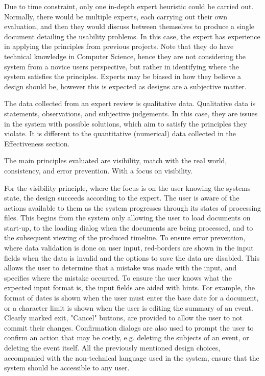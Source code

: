 \par Due to time constraint, only one in-depth expert heuristic could be carried out. Normally, there would be multiple experts, each carrying out their own evaluation, and then they would discuss between themselves to produce a single document detailing the usability problems. In this case, the expert has experience in applying the principles from previous projects. Note that they do have technical knowledge in Computer Science, hence they are not considering the system from a novice users perspective, but rather in identifying where the system satisfies the principles. Experts may be biased in how they believe a design should be, however this is expected as designs are a subjective matter.

\par The data collected from an expert review is qualitative data. Qualitative data is statements, observations, and subjective judgements. In this case, they are issues in the system with possible solutions, which aim to satisfy the principles they violate. It is different to the quantitative (numerical) data collected in the Effectiveness section.

\par The main principles evaluated are visibility, match with the real world, consistency, and error prevention. With a focus on visibility.

\par For the visibility principle, where the focus is on the user knowing the systems state, the design succeeds according to the expert. The user is aware of the actions available to them as the system progresses through its states of processing files. This begins from the system only allowing the user to load documents on start-up, to the loading dialog when the documents are being processed, and to the subsequent viewing of the produced timeline. To ensure error prevention, where data validation is done on user input, red-borders are shown in the input fields when the data is invalid and the options to save the data are disabled. This allows the user to determine that a mistake was made with the input, and specifies where the mistake occurred. To ensure the user knows what the expected input format is, the input fields are aided with hints. For example, the format of dates is shown when the user must enter the base date for a document, or a character limit is shown when the user is editing the summary of an event. Clearly marked exit, "Cancel" buttons, are provided to allow the user to not commit their changes. Confirmation dialogs are also used to prompt the user to confirm an action that may be costly, e.g. deleting the subjects of an event, or deleting the event itself. All the previously mentioned design choices, accompanied with the non-technical language used in the system, ensure that the system should be accessible to any user.

